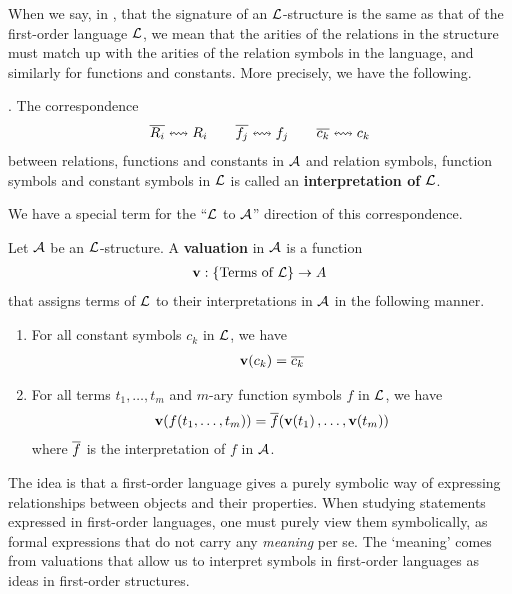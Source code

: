 When we say, in , that the signature of an $\mathcal{L}$-structure is the same as that of the first-order language $\mathcal{L}$, we mean that the arities of the relations in the structure must match up with the arities of the relation symbols in the language, and similarly for functions and constants. More precisely, we have the following.

\begin{boxdefinition}[Interpretation]
    . The correspondence
    \begin{align*}
        \overline{R_i} \leftrightsquigarrow R_i
        \qquad
        \overline{f_j} \leftrightsquigarrow f_j
        \qquad
        \overline{c_k} \leftrightsquigarrow c_k
    \end{align*}
    between relations, functions and constants in $\mathcal{A}$ and relation symbols, function symbols and constant symbols in $\mathcal{L}$ is called an \textbf{interpretation of $\mathcal{L}$}.
\end{boxdefinition}

We have a special term for the ``$\mathcal{L}$ to $\mathcal{A}$'' direction of this correspondence.

\begin{boxdefinition}[Valuation]
    Let $\mathcal{A}$ be an $\mathcal{L}$-structure. A \textbf{valuation} in $\mathcal{A}$ is a function
    \begin{align*}
        \mathbf{v} : \left\{ \text{Terms of } \mathcal{L} \right\} \to A
    \end{align*}
    that assigns terms of $\mathcal{L}$ to their interpretations in $\mathcal{A}$ in the following manner.
    \begin{enumerate}
        \item For all constant symbols $c_k$ in $\mathcal{L}$, we have
        \begin{align*}
            \mathbf{v}\!\left( c_k \right) = \overline{c_k}
        \end{align*}
        
        \item For all terms $t_1, \ldots, t_m$ and $m$-ary function symbols $f$ in $\mathcal{L}$, we have
        \begin{align*}
            \mathbf{v}\!\left( f\!\left( t_1, \ldots, t_m \right) \right) = \overline{f}\!\left( \mathbf{v}\!\left( t_1 \right), \ldots, \mathbf{v}\!\left( t_m \right) \right)
        \end{align*}
        where $\overline{f}$ is the interpretation of $f$ in $\mathcal{A}$.
    \end{enumerate}
\end{boxdefinition}

The idea is that a first-order language gives a purely symbolic way of expressing relationships between objects and their properties. When studying statements expressed in first-order languages, one must purely view them symbolically, as formal expressions that do not carry any \textit{meaning} per se. The `meaning' comes from valuations that allow us to interpret symbols in first-order languages as ideas in first-order structures.

